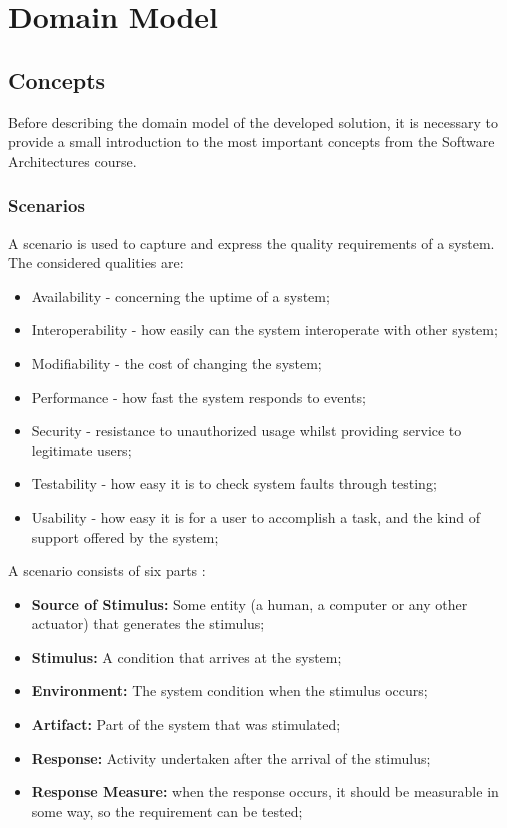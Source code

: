 \chapter{Domain Model}
\label{chapter:domainModel}

\section{Concepts}
\label{section:SAConcepts}
Before describing the domain model of the developed solution, it is necessary to provide a small introduction to the most important concepts from the Software Architectures course.
\subsection{Scenarios}
A scenario is used to capture and express the quality requirements of a system. The considered qualities are:
\begin{itemize}
\item Availability - concerning the uptime of a system;
\item Interoperability - how easily can the system interoperate with other system;
\item Modifiability - the cost of changing the system;
\item Performance - how fast the system responds to events;
\item Security - resistance to unauthorized usage whilst providing service to legitimate users;
\item Testability - how easy it is to check system faults through testing;
\item Usability - how easy it is for a user to accomplish a task, and the kind of support offered by the system;
\end{itemize}

A scenario consists of six parts \cite{bass2003software}:
\begin{itemize}
\item \textbf{Source of Stimulus:} Some entity (a human, a computer or any other actuator) that generates the stimulus;
\item \textbf{Stimulus:} A condition that arrives at the system;
\item \textbf{Environment:} The system condition when the stimulus occurs;
\item \textbf{Artifact:} Part of the system that was stimulated;
\item \textbf{Response:} Activity undertaken after the arrival of the stimulus;
\item \textbf{Response Measure:} when the response occurs, it should be measurable in some way, so the requirement can be tested;
\end{itemize}

